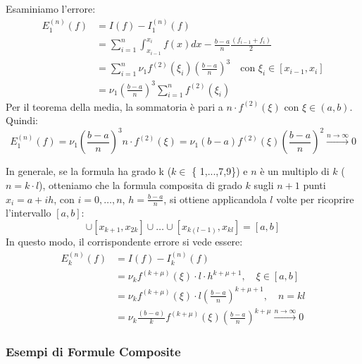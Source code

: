 Esaminiamo l'errore:
\begin{align*}
E_1^{(n)}(f) &= I(f) - I_1^{(n)}(f) \\
&= \sum_{i=1}^{n} \int_{x_{i-1}}^{x_i} f(x) dx - \frac{b-a}{n} \frac{(f_{i-1} + f_i)}{2} \\
&= \sum_{i=1}^{n} \nu_1 f^{(2)}(\xi_i) \left( \frac{b-a}{n} \right)^3 \quad \text{con } \xi_i \in [x_{i-1}, x_i] \\
&= \nu_1 \left( \frac{b-a}{n} \right)^3 \sum_{i=1}^{n} f^{(2)}(\xi_i)
\end{align*}
Per il teorema della media, la sommatoria è pari a $n \cdot f^{(2)}(\xi)$ con $\xi \in (a,b)$. Quindi:
\begin{equation} \label{eq:errore_composita_trapezi_finale}
E_1^{(n)}(f) = \nu_1 \left( \frac{b-a}{n} \right)^3 n \cdot f^{(2)}(\xi) = \nu_1 (b-a) f^{(2)}(\xi) \left( \frac{b-a}{n} \right)^2 \xrightarrow{n \to \infty} 0
\end{equation}

In generale, se la formula ha grado k ($k \in$ \{ 1,...,7,9\}) e $n$ è un multiplo di $k$ ($n = k \cdot l$), otteniamo che la formula composita di grado $k$ sugli $n+1$ punti $x_i = a+ih$, con $i=0,\dots, n$, $h=\frac{b-a}{n}$, si ottiene applicandola $l$ volte per ricoprire l'intervallo $[a,b]$:
\begin{equation*}
[x_0, x_k] \cup [x_{k+1}, x_{2k}] \cup \dots \cup [x_{k(l-1)}, x_{kl}] = [a,b]
\end{equation*}
In questo modo, il corrispondente errore si vede essere:
\begin{equation} \label{eq:errore_composita_generale}
\begin{split}
E_k^{(n)}(f) &= I(f) - I_k^{(n)}(f) \\[1ex]
&= \nu_k f^{(k+\mu)}(\xi) \cdot l \cdot h^{k+\mu+1}, \quad \xi \in [a,b] \\[1ex]
&= \nu_k f^{(k+\mu)}(\xi) \cdot l \left( \frac{b-a}{n} \right)^{k+\mu+1}, \quad n = kl \\[1ex]
&= \nu_k \frac{(b-a)}{k} f^{(k+\mu)}(\xi) \left( \frac{b-a}{n} \right)^{k+\mu} \xrightarrow{n \to \infty} 0
\end{split}
\end{equation}

\vspace{0.6cm}
\subsubsection*{Esempi di Formule Composite}

